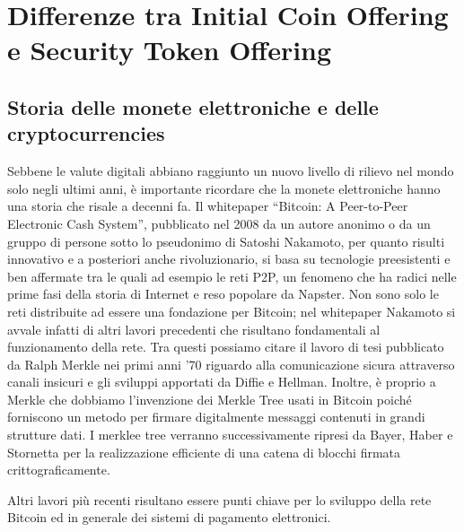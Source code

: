\chapter{Differenze tra Initial Coin Offering e Security Token Offering}                %
\lhead[\fancyplain{}{\bfseries\thepage}]{\fancyplain{}{\bfseries\rightmark}}


\section{Storia delle monete elettroniche e delle cryptocurrencies}

Sebbene le valute digitali abbiano raggiunto un nuovo livello di rilievo nel mondo solo negli ultimi anni, è importante ricordare che la monete elettroniche hanno una storia che risale a decenni fa. Il whitepaper “Bitcoin: A Peer-to-Peer Electronic Cash System”, pubblicato nel 2008 da un autore anonimo o da un gruppo di persone sotto lo pseudonimo di Satoshi Nakamoto, per quanto risulti innovativo e a posteriori anche rivoluzionario, si basa su tecnologie preesistenti e ben affermate tra le quali ad esempio le reti P2P, un fenomeno che ha radici nelle prime fasi della storia di Internet e reso popolare da Napster. Non sono solo le reti distribuite ad essere una fondazione per Bitcoin; nel whitepaper Nakamoto si avvale infatti di altri lavori precedenti che risultano fondamentali al funzionamento della rete. Tra questi possiamo citare il lavoro di tesi pubblicato da Ralph Merkle nei primi anni ’70  riguardo alla comunicazione sicura attraverso canali insicuri e gli sviluppi apportati da Diffie e Hellman. Inoltre, è proprio a Merkle che dobbiamo l’invenzione dei Merkle Tree usati in Bitcoin poiché forniscono un metodo per firmare digitalmente messaggi contenuti in grandi strutture dati. I merklee tree verranno successivamente ripresi da Bayer, Haber e Stornetta per la realizzazione efficiente di una catena di blocchi firmata crittograficamente.


Altri lavori più recenti risultano essere punti chiave per lo sviluppo della rete Bitcoin ed in generale dei sistemi di pagamento elettronici.



